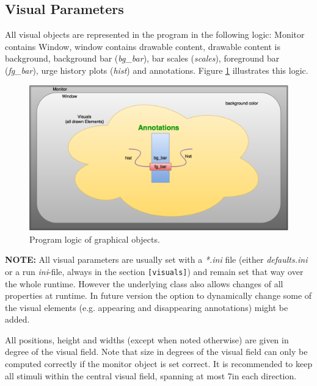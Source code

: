 \documentclass[12pt,a4paper]{book}
\begin{document}
\subsection{Visual Parameters}\label{ssec:visuals}

All visual objects are represented in the program in the following logic: Monitor contains Window, window contains drawable content, drawable content is background, background bar (\emph{bg\_bar}), bar scales (\emph{scales}), foreground bar (\emph{fg\_bar}), urge history plots (\emph{hist}) and annotations. Figure \ref{fig:graph_log} illustrates this logic.

\begin{figure}
\includegraphics[width = \linewidth]{ressources/urge_graph}
\caption{Program logic of graphical objects.}
\label{fig:graph_log}
\end{figure}

\textbf{NOTE:} All visual parameters are usually set with a \emph{*.ini} file (either \textit{defaults.ini} or a run \textit{ini}-file, always in the section \verb|[visuals]|) and remain set that way over the whole runtime. However the underlying class also allows changes of all properties at runtime. In future version the option to dynamically change some of the visual elements (e.g. appearing and disappearing annotations) might be added.

All positions, height and widths (except when noted otherwise) are given in degree of the visual field. Note that size in degrees of the visual field can only be computed correctly if the monitor object is set correct. It is recommended to keep all stimuli within the central visual field, spanning at most 7\degree  in each direction.
\end{document}
